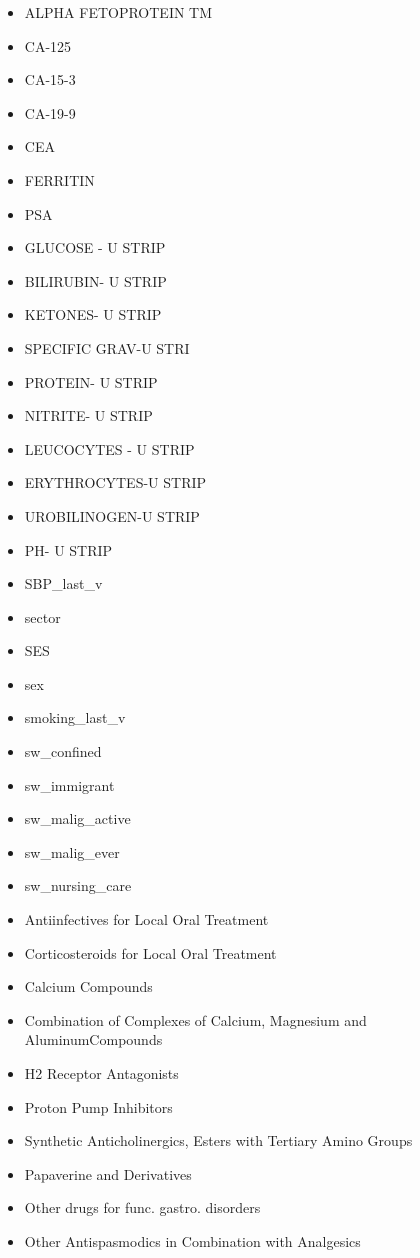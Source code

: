 \documentclass[a4paper,12pt]{article}
\begin{document}
\begin{appendices}
\begin{itemize}
   			\item ALPHA FETOPROTEIN TM
   			\item CA-125
   			\item CA-15-3
   			\item CA-19-9
   			\item CEA
   			\item FERRITIN
   			\item PSA
   			\item GLUCOSE - U STRIP
   			\item BILIRUBIN- U STRIP
   			\item KETONES- U STRIP
   			\item SPECIFIC GRAV-U STRI
   			\item PROTEIN- U STRIP
   			\item NITRITE- U STRIP
   			\item LEUCOCYTES - U STRIP
   			\item ERYTHROCYTES-U STRIP
   			\item UROBILINOGEN-U STRIP
   			\item PH- U STRIP
   			\item SBP\_last\_v
   			\item sector
   			\item SES
   			\item sex
   			\item smoking\_last\_v
   			\item sw\_confined
   			\item sw\_immigrant
   			\item sw\_malig\_active
   			\item sw\_malig\_ever
   			\item sw\_nursing\_care
   			\item Antiinfectives for Local Oral Treatment
   			\item Corticosteroids for Local Oral Treatment
   			\item Calcium Compounds
   			\item Combination of Complexes of Calcium, Magnesium and AluminumCompounds
   			\item H2 Receptor Antagonists
   			\item Proton Pump Inhibitors
   			\item Synthetic Anticholinergics, Esters with Tertiary Amino Groups
   			\item Papaverine and Derivatives
   			\item Other drugs for func. gastro. disorders
   			\item Other Antispasmodics in Combination with Analgesics

\end{itemize}
\end{appendices}
\end{document}
